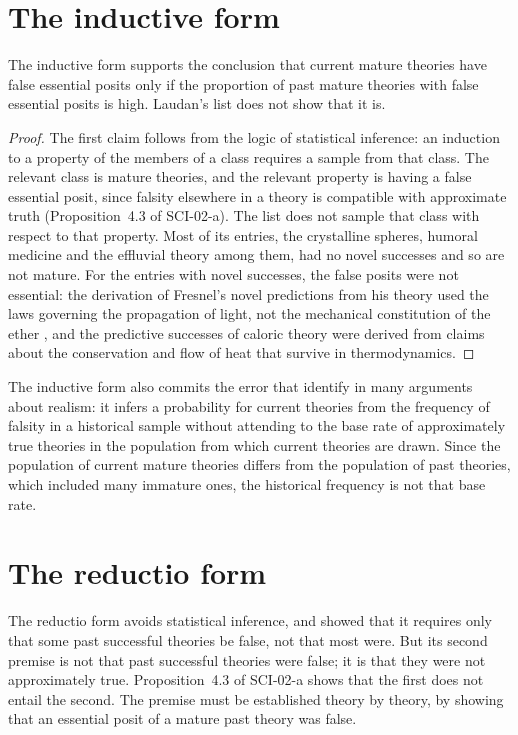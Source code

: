 \documentclass{situationist-preprint}
\begin{document}
\section{The inductive form}\label{s:inductive}

\begin{proposition}\label{p:base}
The inductive form supports the conclusion that current mature theories have false essential posits only if the proportion of past mature theories with false essential posits is high. Laudan's list does not show that it is.
\end{proposition}

\begin{proof}
The first claim follows from the logic of statistical inference: an induction to a property of the members of a class requires a sample from that class. The relevant class is mature theories, and the relevant property is having a false essential posit, since falsity elsewhere in a theory is compatible with approximate truth (Proposition~4.3 of SCI-02-a). The list does not sample that class with respect to that property. Most of its entries, the crystalline spheres, humoral medicine and the effluvial theory among them, had no novel successes and so are not mature. For the entries with novel successes, the false posits were not essential: the derivation of Fresnel's novel predictions from his theory used the laws governing the propagation of light, not the mechanical constitution of the ether \citep{Psillos1999}, and the predictive successes of caloric theory were derived from claims about the conservation and flow of heat that survive in thermodynamics.
\end{proof}

The inductive form also commits the error that \citet{MagnusCallender2004} identify in many arguments about realism: it infers a probability for current theories from the frequency of falsity in a historical sample without attending to the base rate of approximately true theories in the population from which current theories are drawn. Since the population of current mature theories differs from the population of past theories, which included many immature ones, the historical frequency is not that base rate.

\section{The reductio form}\label{s:reductio}

The reductio form avoids statistical inference, and \citet{Lewis2001} showed that it requires only that some past successful theories be false, not that most were. But its second premise is not that past successful theories were false; it is that they were not approximately true. Proposition~4.3 of SCI-02-a shows that the first does not entail the second. The premise must be established theory by theory, by showing that an essential posit of a mature past theory was false.
\end{document}
